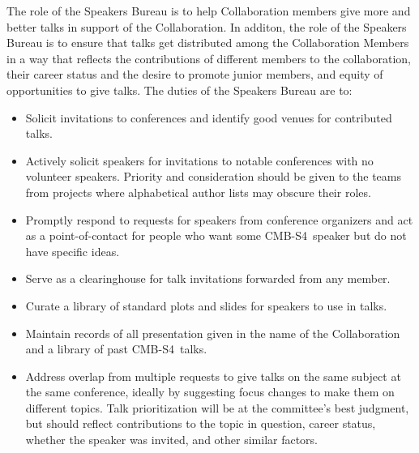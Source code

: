 \documentclass[12pt]{article}
\newcommand\collabname{CMB-S4}
\begin{document}
The role of the Speakers Bureau is to help Collaboration members give more and better talks in support of the Collaboration. In additon, the role of the Speakers Bureau is to ensure that talks get distributed among the Collaboration Members in a way that reflects the contributions of different members to the collaboration, their career status and the desire to promote junior members, and equity of opportunities to give talks. The duties of the Speakers Bureau are to:
\begin{itemize}
\item Solicit invitations to conferences and identify good venues for contributed talks.
\item Actively solicit speakers for invitations to notable conferences with no volunteer speakers. Priority and consideration should be given to the teams from projects where alphabetical author lists may obscure their roles. 
\item Promptly respond to requests for speakers from conference organizers and act as a point-of-contact for people who want some \collabname\ speaker but do not have specific ideas.
\item {\color{\markcolor} Serve as a clearinghouse for talk invitations forwarded from any member.}
\item Curate a library of standard plots and slides for speakers to use in talks.
\item {\color{\markcolor}Maintain records of all presentation given in the name of the Collaboration} and a library of past \collabname\  talks.
\item Address overlap from multiple requests to give talks on the same subject at the same conference, ideally by suggesting focus changes to make them on different topics. Talk prioritization will be at the committee's best judgment, but should reflect contributions to the topic in question, career status, whether the speaker was invited, and other similar factors.
\end{itemize}
\end{document}

